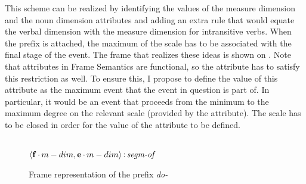 This scheme can be realized by identifying the values of the measure dimension and the noun dimension attributes and adding an extra rule that would equate the verbal dimension with the measure dimension for intransitive verbs. When the prefix is attached, the maximum of the scale has to be associated with the final stage of the event. The frame that realizes these ideas is shown on . Note that attributes in Frame Semantics are functional, so the attribute \PARTOF has to satisfy this restriction as well. To ensure this, I propose to define the value of this attribute as  the maximum event that the event in question is part of. In particular, it would be an event that proceeds from the minimum to the maximum degree on the relevant scale (provided by the \MDIM attribute). The scale has to be closed in order for the value of the \PARTOF attribute to be defined.

\begin{figure}
\begin{minipage}{0.45\textwidth}
 \end{minipage}\hfill%
 \begin{minipage}{0.45\textwidth}\centering
{}\\
$\langle{\textbf{\textrm{f}}\,{\cdot}\,m-dim,\textbf{\textrm{e}}\,{\cdot}\,m-dim}\rangle\,{:}\,\textit{segm-of}$\\[1ex]
\end{minipage}
\caption{Frame representation of the prefix \textit{do-} \label{frame:do}}
\end{figure}

